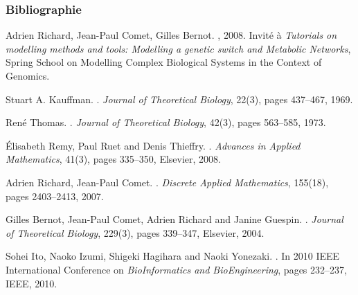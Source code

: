 
\begin{frame}[c]
  \frametitle{Bibliographie}

\small
\setlength{\parindent}{-1em}
\setlength{\parskip}{0.5em}

\tcitebullet Adrien Richard, Jean-Paul Comet, Gilles Bernot.
, 2008.
Invité à \textit{Tutorials on modelling methods and tools: Modelling a genetic switch and Metabolic Networks}, Spring School on Modelling Complex Biological Systems in the Context of Genomics.

\tcitebullet Stuart A. Kauffman.
.
\textit{Journal of Theoretical Biology}, 22(3), pages 437--467, 1969.

\tcitebullet René Thomas.
.
\textit{Journal of Theoretical Biology}, 42(3), pages 563--585, 1973.

\tcitebullet Élisabeth Remy, Paul Ruet and Denis Thieffry.
.
\textit{Advances in Applied Mathematics}, 41(3), pages 335--350, Elsevier, 2008.

\tcitebullet Adrien Richard, Jean-Paul Comet.
.
\textit{Discrete Applied Mathematics}, 155(18), pages 2403--2413, 2007.

\tcitebullet Gilles Bernot, Jean-Paul Comet, Adrien Richard and Janine Guespin.
.
\textit{Journal of Theoretical Biology}, 229(3), pages 339--347, Elsevier, 2004.

\tcitebullet Sohei Ito, Naoko Izumi, Shigeki Hagihara and Naoki Yonezaki.
.
In 2010 IEEE International Conference on \textit{BioInformatics and BioEngineering}, pages 232--237, IEEE, 2010.

\end{frame}



